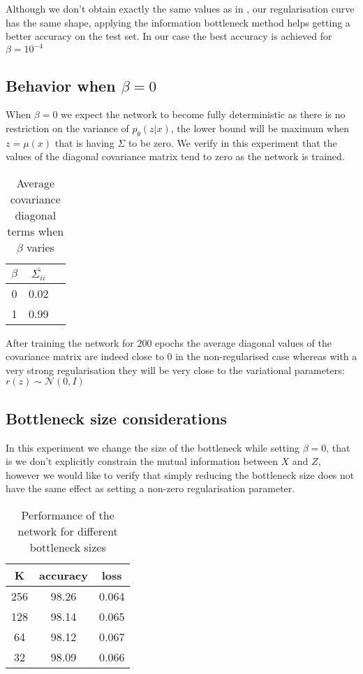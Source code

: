 \documentclass[11pt,oneside,openright]{report}
\begin{document}
Although we don't obtain exactly the same values as in \cite{vib}, our regularisation curve has the same shape, applying the information bottleneck method helps getting a better accuracy on the test set. In our case the best accuracy is achieved for $\beta = 10^{-4}$

\subsection{Behavior when $\beta = 0$}
When $\beta = 0$ we expect the network to become fully deterministic as there is no restriction on the variance of $p_\theta(z|x)$, the lower bound will be maximum when $z = \mu(x)$  that is having $\Sigma$ to be zero. We verify in this experiment that the values of the diagonal covariance matrix tend to zero as the network is trained.

\begin {table}[H]
\begin{center}
\begin{tabular}{ c | c c }
 $\beta$ & $\bar{\Sigma_{ii}}$ \\
 \hline
0 & 0.02\\
1 & 0.99 \\
\end{tabular}
\end{center}
\caption{Average covariance diagonal terms when $\beta$ varies}
\end {table}

After training the network for 200 epochs the average diagonal values of the covariance matrix are indeed close to 0 in the non-regularised case whereas with a very strong regularisation they will be very close to the variational parameters: $r(z) \sim \mathcal{N}(0, I)$

\subsection{Bottleneck size considerations}
In this experiment we change the size of the bottleneck while setting $\beta = 0$, that is we don't explicitly constrain the mutual information between $X$ and $Z$, however we would like to verify that simply reducing the bottleneck size does not have the same effect as setting a non-zero regularisation parameter.

\begin {table}[H]
\begin{center}
\begin{tabular}{ c | c c }
 K & accuracy & loss \\
 \hline
256 & 98.26 & 0.064 \\
128 & 98.14 & 0.065 \\
64 & 98.12& 0.067 \\
32 & 98.09 & 0.066 \\
\end{tabular}
\end{center}
\caption{Performance of the network for different bottleneck sizes}
\end {table}
\end{document}
